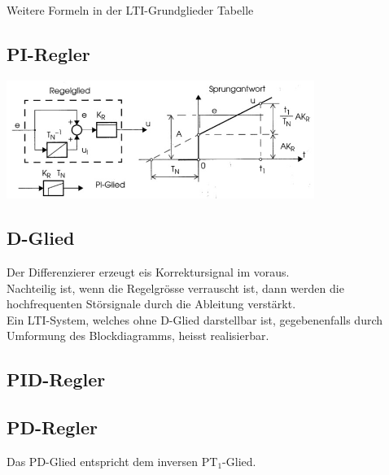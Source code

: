 		Weitere Formeln in der LTI-Grundglieder Tabelle
	
	\subsection{PI-Regler }
		\includegraphics[width=10cm]{./images/PI_Regler.jpg} \\
		\qquad
		\qquad
	
	\subsection{D-Glied }
		Der Differenzierer erzeugt eis Korrektursignal im voraus.\\
		Nachteilig ist, wenn die Regelgrösse verrauscht ist, dann werden die
		hochfrequenten Störsignale durch die Ableitung verstärkt.\\
		Ein LTI-System, welches ohne D-Glied darstellbar ist, gegebenenfalls durch
		Umformung des Blockdiagramms, heisst realisierbar.
	
	\subsection{PID-Regler  }
	
	\subsection{PD-Regler  }
	 \qquad
	Das PD-Glied entspricht dem inversen PT$_1$-Glied.
	
